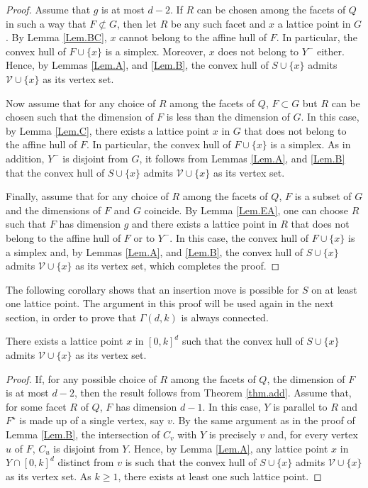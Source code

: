 \begin{proof}
Assume that $g$ is at most $d-2$. If $R$ can be chosen among the facets of $Q$ in such a way that $F\not\subset{G}$, then let $R$ be any such facet and $x$ a lattice point in $G$. By Lemma \ref{Lem.BC}, $x$ cannot belong to the affine hull of $F$. In particular, the convex hull of $F\cup\{x\}$ is a simplex. Moreover, $x$ does not belong to $Y^-$ either. Hence, by Lemmas \ref{Lem.A}, and \ref{Lem.B}, the convex hull of $S\cup\{x\}$ admits $\mathcal{V}\cup\{x\}$ as its vertex set.

Now assume that for any choice of $R$ among the facets of $Q$, $F\subset{G}$ but $R$ can be chosen such that the dimension of $F$ is less than the dimension of $G$. In this case, by Lemma \ref{Lem.C}, there exists a lattice point $x$ in $G$ that does not belong to the affine hull of $F$. In particular, the convex hull of $F\cup\{x\}$ is a simplex. As in addition, $Y^-$ is disjoint from $G$, it follows from Lemmas \ref{Lem.A}, and \ref{Lem.B} that the convex hull of $S\cup\{x\}$ admits $\mathcal{V}\cup\{x\}$ as its vertex set.

Finally, assume that for any choice of $R$ among the facets of $Q$, $F$ is a subset of $G$ and the dimensions of $F$ and $G$ coincide. By Lemma \ref{Lem.EA}, one can choose $R$ such that $F$ has dimension $g$ and there exists a lattice point in $R$ that does not belong to the affine hull of $F$ or to $Y^-$. In this case, the convex hull of $F\cup\{x\}$ is a simplex and, by Lemmas \ref{Lem.A}, and \ref{Lem.B}, the convex hull of $S\cup\{x\}$ admits $\mathcal{V}\cup\{x\}$ as its vertex set, which completes the proof.
\end{proof}

The following corollary shows that an insertion move is possible for $S$ on at least one lattice point. The argument in this proof will be used again in the next section, in order to prove that $\Gamma(d,k)$ is always connected.

\begin{corollary}\label{cor.add}
There exists a lattice point $x$ in $[0,k]^d$ such that the convex hull of $S\cup\{x\}$ admits $\mathcal{V}\cup\{x\}$ as its vertex set.
\end{corollary}
\begin{proof}
If, for any possible choice of $R$ among the facets of $Q$, the dimension of $F$ is at most $d-2$, then the result follows from Theorem \ref{thm.add}. Assume that, for some facet $R$ of $Q$, $F$ has dimension $d-1$. In this case, $Y$ is parallel to $R$ and $F^\star$ is made up of a single vertex, say $v$. By the same argument as in the proof of Lemma \ref{Lem.B}, the intersection of $C_v$ with $Y$ is precisely $v$ and, for every vertex $u$ of $F$, $C_u$ is disjoint from $Y$. Hence, by Lemma \ref{Lem.A}, any lattice point $x$ in $Y\cap[0,k]^d$ distinct from $v$ is such that the convex hull of $S\cup\{x\}$ admits $\mathcal{V}\cup\{x\}$ as its vertex set. As $k\geq1$, there exists at least one such lattice point.
\end{proof}

